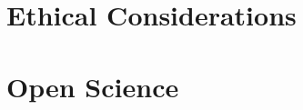 \documentclass[letterpaper,twocolumn,10pt]{article}
\begin{document}
% 


\appendix
\section*{Ethical Considerations}



\section*{Open Science}




\appendix

\end{document}
